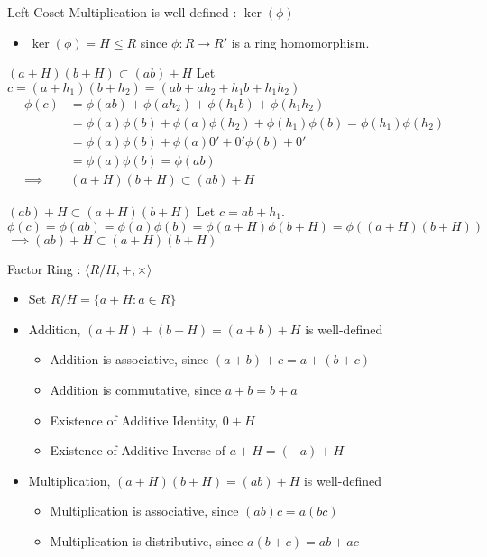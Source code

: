 \documentclass{beamer}
\newcommand{\subring}{\le}
\begin{document}
\begin{frame}{Left Coset Multiplication is well-defined : $\ker(\phi)$}
\begin{itemize}
	\item $\ker(\phi) = H \subring R$ since $\phi : R \to R'$ is a ring homomorphism.
\end{itemize}
\begin{block}{$(a+H)(b+H) \subset (ab)+H$}
	Let $c = (a+h_1)(b+h_2) = (ab + ah_2 + h_1b + h_1h_2)$ 
 	\begin{align*}
		\phi(c) & = \phi(ab) + \phi(ah_2) + \phi(h_1b) + \phi(h_1h_2) \\
			& = \phi(a)\phi(b) + \phi(a)\phi(h_2) + \phi(h_1)\phi(b) = \phi(h_1)\phi(h_2) \\
			& = \phi(a)\phi(b) + \phi(a)0' + 0'\phi(b) + 0' \\
			& = \phi(a)\phi(b) = \phi(ab) \\
		\implies & (a+H)(b+H) \subset (ab)+H
	\end{align*}
\end{block}
\begin{block}{$(ab)+H \subset (a+H)(b+H)$}
	Let $c = ab+h_1$.\\
	$\phi(c)  = \phi(ab) = \phi(a)\phi(b)  = \phi(a+H)\phi(b+H)  = \phi((a+H)(b+H))$ \\
	$\implies (ab)+H  \subset (a+H)(b+H)$
\end{block}
\end{frame}

\begin{frame}{Factor Ring : $\langle R/H, + , \times \rangle$ }
\begin{itemize}
	\item Set $R/H = \{ a + H : a \in R \}$
	\item Addition, $(a+H)+(b+H) = (a+b) + H$ is well-defined
	\begin{itemize}
		\item Addition is associative, since $(a+b)+c = a+(b+c)$
		\item Addition is commutative, since $a+b = b+a$
		\item Existence of Additive Identity, $0 + H$
		\item Existence of Additive Inverse of $a+H = (-a) + H$
	\end{itemize}
	\item Multiplication, $(a+H)(b+H) = (ab) + H$ is well-defined
	\begin{itemize}
		\item Multiplication is associative, since $(ab)c = a(bc)$
		\item Multiplication is distributive, since $a(b+c) = ab+ac$
	\end{itemize}
\end{itemize}
\end{frame}
\end{document}
